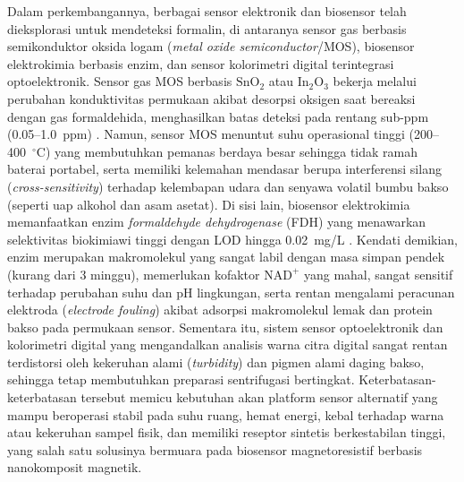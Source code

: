 Dalam perkembangannya, berbagai sensor elektronik dan biosensor telah dieksplorasi untuk mendeteksi formalin, di antaranya sensor gas berbasis semikonduktor oksida logam (\textit{metal oxide semiconductor}/MOS), biosensor elektrokimia berbasis enzim, dan sensor kolorimetri digital terintegrasi optoelektronik. Sensor gas MOS berbasis $\mathrm{SnO_2}$ atau $\mathrm{In_2O_3}$ bekerja melalui perubahan konduktivitas permukaan akibat desorpsi oksigen saat bereaksi dengan gas formaldehida, menghasilkan batas deteksi pada rentang sub-ppm (0.05--1.0~ppm) \cite{wang2021mos}. Namun, sensor MOS menuntut suhu operasional tinggi (200--400~$^\circ\mathrm{C}$) yang membutuhkan pemanas berdaya besar sehingga tidak ramah baterai portabel, serta memiliki kelemahan mendasar berupa interferensi silang (\textit{cross-sensitivity}) terhadap kelembapan udara dan senyawa volatil bumbu bakso (seperti uap alkohol dan asam asetat). Di sisi lain, biosensor elektrokimia memanfaatkan enzim \textit{formaldehyde dehydrogenase} (FDH) yang menawarkan selektivitas biokimiawi tinggi dengan LOD hingga 0.02~mg/L \cite{singhal2024food}. Kendati demikian, enzim merupakan makromolekul yang sangat labil dengan masa simpan pendek (kurang dari 3 minggu), memerlukan kofaktor $\mathrm{NAD}^+$ yang mahal, sangat sensitif terhadap perubahan suhu dan pH lingkungan, serta rentan mengalami peracunan elektroda (\textit{electrode fouling}) akibat adsorpsi makromolekul lemak dan protein bakso pada permukaan sensor. Sementara itu, sistem sensor optoelektronik dan kolorimetri digital yang mengandalkan analisis warna citra digital \cite{sun2023optical} sangat rentan terdistorsi oleh kekeruhan alami (\textit{turbidity}) dan pigmen alami daging bakso, sehingga tetap membutuhkan preparasi sentrifugasi bertingkat. Keterbatasan-keterbatasan tersebut memicu kebutuhan akan platform sensor alternatif yang mampu beroperasi stabil pada suhu ruang, hemat energi, kebal terhadap warna atau kekeruhan sampel fisik, dan memiliki reseptor sintetis berkestabilan tinggi, yang salah satu solusinya bermuara pada biosensor magnetoresistif berbasis nanokomposit magnetik.

